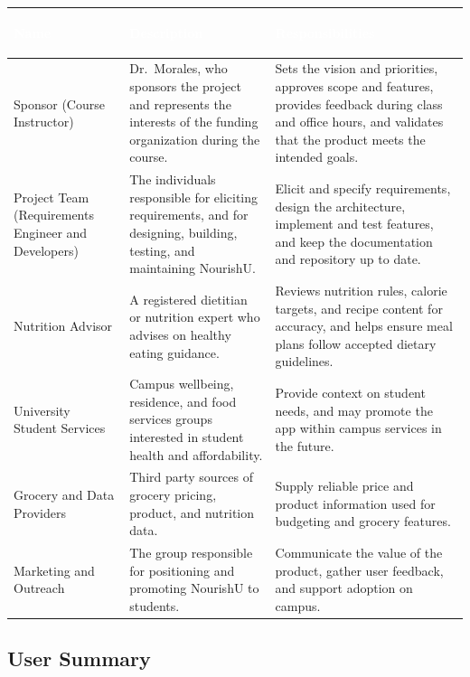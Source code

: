 \documentclass[11pt,a4paper]{article}
\begin{document}
\begin{tabularx}{\textwidth}{>{\bfseries\raggedright\arraybackslash}p{} Y Y}
\toprule
{}\textcolor{white}{\textbf{Name}} & \textcolor{white}{\textbf{Description}} & \textcolor{white}{\textbf{Responsibilities}} \\
\midrule
Sponsor (Course Instructor) & Dr.\ Morales, who sponsors the project and represents the interests of the funding organization during the course. & Sets the vision and priorities, approves scope and features, provides feedback during class and office hours, and validates that the product meets the intended goals. \\
Project Team (Requirements Engineer and Developers) & The individuals responsible for eliciting requirements, and for designing, building, testing, and maintaining NourishU. & Elicit and specify requirements, design the architecture, implement and test features, and keep the documentation and repository up to date. \\
Nutrition Advisor & A registered dietitian or nutrition expert who advises on healthy eating guidance. & Reviews nutrition rules, calorie targets, and recipe content for accuracy, and helps ensure meal plans follow accepted dietary guidelines. \\
University Student Services & Campus wellbeing, residence, and food services groups interested in student health and affordability. & Provide context on student needs, and may promote the app within campus services in the future. \\
Grocery and Data Providers & Third party sources of grocery pricing, product, and nutrition data. & Supply reliable price and product information used for budgeting and grocery features. \\
Marketing and Outreach & The group responsible for positioning and promoting NourishU to students. & Communicate the value of the product, gather user feedback, and support adoption on campus. \\
\bottomrule
\end{tabularx}

\subsection{User Summary}
\end{document}
